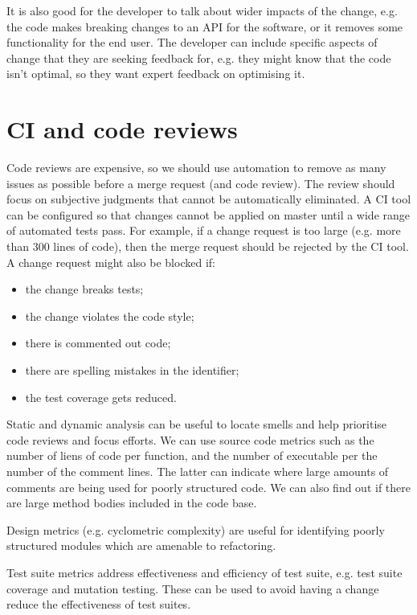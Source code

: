 \documentclass[a4paper, openany]{memoir}
\begin{document}
It is also good for the developer to talk about wider impacts of the change, e.g. the code makes breaking changes to an API for the software, or it removes some functionality for the end user. The developer can include specific aspects of change that they are seeking feedback for, e.g. they might know that the code isn't optimal, so they want expert feedback on optimising it.

\section{CI and code reviews}
Code reviews are expensive, so we should use automation to remove as many issues as possible before a merge request (and code review). The review should focus on subjective judgments that cannot be automatically eliminated. A CI tool can be configured so that changes cannot be applied on master until a wide range of automated tests pass. For example, if a change request is too large (e.g. more than 300 lines of code), then the merge request should be rejected by the CI tool. A change request might also be blocked if:
\begin{itemize}
    \item the change breaks tests;
    \item the change violates the code style;
    \item there is commented out code;
    \item there are spelling mistakes in the identifier;
    \item the test coverage gets reduced.
\end{itemize}

Static and dynamic analysis can be useful to locate smells and help prioritise code reviews and focus efforts. We can use source code metrics such as the number of liens of code per function, and the number of executable per the number of the comment lines. The latter can indicate where large amounts of comments are being used for poorly structured code. We can also find out if there are large method bodies included in the code base.

Design metrics (e.g. cyclometric complexity) are useful for identifying poorly structured modules which are amenable to refactoring. 

Test suite metrics address effectiveness and efficiency of test suite, e.g. test suite coverage and mutation testing. These can be used to avoid having a change reduce the effectiveness of test suites.
\end{document}
